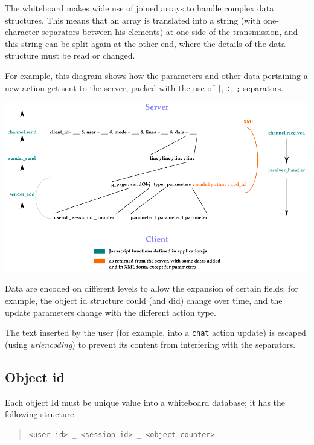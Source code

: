\documentclass[10pt,a4paper,english]{book}
\begin{document}
The whiteboard makes wide use of joined arrays to handle complex data
structures. This means that an array is translated into a string (with
one-character separators between his elements) at one side of the
transmission, and this string can be split again at the other end,
where the details of the data structure must be read or changed.

For example, this diagram shows how the parameters and other data
pertaining a new action get sent to the server, packed with the use
of \texttt{|}, \texttt{:}, \texttt{;} separators.

\includegraphics{images/sending_update_separators.png}

Data are encoded on different levels to allow the expansion of certain
fields; for example, the object id structure could (and did) change
over time, and the update parameters change with the different action
type.

The text inserted by the user (for example, into a \texttt{chat} action
update) is escaped (using \emph{urlencoding}) to prevent its content from
interfering with the separators.



\hypertarget{object-id}{}
\subsection{Object id}
\label{object-id}

Each object Id must be unique value into a whiteboard database; it has
the following structure:
\begin{quote}\begin{verbatim}
<user id> _ <session id> _ <object counter>
\end{verbatim}
\end{quote}
\end{document}
